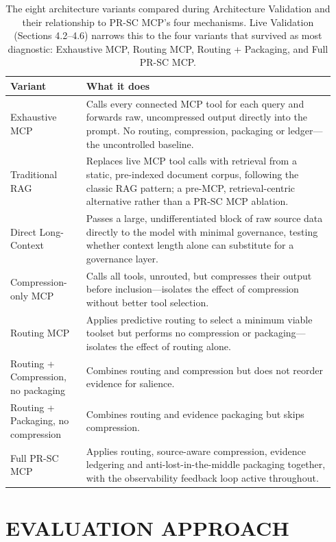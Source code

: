 \begin{table}[!t]
  \caption{The eight architecture variants compared during Architecture Validation and their relationship to PR-SC MCP's four mechanisms. Live Validation (Sections 4.2--4.6) narrows this to the four variants that survived as most diagnostic: Exhaustive MCP, Routing MCP, Routing + Packaging, and Full PR-SC MCP.}
  \label{tab:variants}
  \begin{tabular}{p{0.22\linewidth}p{0.72\linewidth}}
    \toprule
    \textbf{Variant} & \textbf{What it does} \\
    \midrule
    Exhaustive MCP & Calls every connected MCP tool for each query and forwards raw, uncompressed output directly into the prompt. No routing, compression, packaging or ledger---the uncontrolled baseline. \\
    Traditional RAG & Replaces live MCP tool calls with retrieval from a static, pre-indexed document corpus, following the classic RAG pattern; a pre-MCP, retrieval-centric alternative rather than a PR-SC MCP ablation. \\
    Direct Long-Context & Passes a large, undifferentiated block of raw source data directly to the model with minimal governance, testing whether context length alone can substitute for a governance layer. \\
    Compression-only MCP & Calls all tools, unrouted, but compresses their output before inclusion---isolates the effect of compression without better tool selection. \\
    Routing MCP & Applies predictive routing to select a minimum viable toolset but performs no compression or packaging---isolates the effect of routing alone. \\
    Routing + Compression, no packaging & Combines routing and compression but does not reorder evidence for salience. \\
    Routing + Packaging, no compression & Combines routing and evidence packaging but skips compression. \\
    Full PR-SC MCP & Applies routing, source-aware compression, evidence ledgering and anti-lost-in-the-middle packaging together, with the observability feedback loop active throughout. \\
    \bottomrule
  \end{tabular}
\end{table}

\section{EVALUATION APPROACH}

